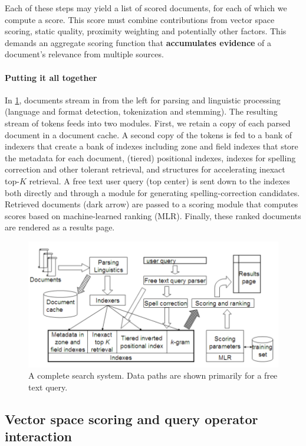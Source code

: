 \documentclass[letterpaper,11pt]{article}
\begin{document}
Each of these steps may yield a list of scored documents, for each of which we compute a score. This score must combine contributions from vector space scoring, static quality, proximity weighting and potentially other factors. This demands an aggregate scoring function that \textbf{accumulates evidence} of a document’s relevance from multiple sources. 

\paragraph{Putting it all together}
In \ref{Complete-scheme}, documents stream in from the left for parsing and linguistic processing (language and format detection, tokenization and stemming). The resulting stream of tokens feeds into two modules. First, we retain a copy of each parsed document in a document cache. A second copy of the tokens is fed to a bank of indexers that create a bank of indexes including zone and field indexes that store the metadata for each document, (tiered) positional indexes, indexes for spelling correction and other tolerant retrieval, and structures for accelerating inexact top-$K$ retrieval. A free text user query (top center) is sent down to the indexes both directly and through a module for generating spelling-correction candidates. Retrieved documents (dark arrow) are passed to a scoring module that computes scores based on machine-learned ranking (MLR). Finally, these ranked documents are rendered as a results page.
\begin{figure}[H]
    \centering
    \includegraphics[scale=0.65]{sect7/figure_7_5.png}
    \caption{A complete search system. Data paths are shown primarily for a free text query.}
    \label{Complete-scheme}
\end{figure}

\subsection{Vector space scoring and query operator interaction}
\end{document}
